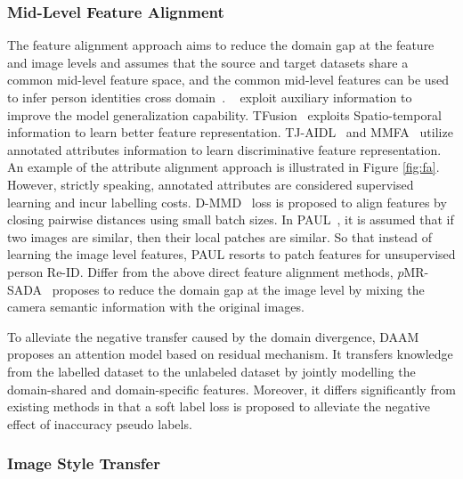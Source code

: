 \documentclass[a4paper,fleqn]{cas-dc}
\begin{document}
\subsubsection{Mid-Level Feature Alignment}
The feature alignment approach aims to reduce the domain gap at the feature and image levels and assumes that the source and target datasets share a common mid-level feature space, and the common mid-level features can be used to infer person identities cross domain~\cite{lin_multi-task_2018,wang_transferable_2018}. ~\cite{wang_transferable_2018,zhong_generalizing_2018,lv_unsupervised_2018} exploit auxiliary information to improve the model generalization capability. TFusion~\cite{lv_unsupervised_2018} exploits Spatio-temporal information to learn better feature representation. TJ-AIDL~\cite{wang_transferable_2018} and MMFA~\cite{lin_multi-task_2018} utilize annotated attributes information to learn discriminative feature representation. An example of the attribute alignment approach is illustrated in Figure \ref{fig:fa}. However, strictly speaking, annotated attributes are considered supervised learning and incur labelling costs. D-MMD~\cite{vedaldi_unsupervised_2020-1} loss is proposed to align features by closing pairwise distances using small batch sizes. In PAUL~\cite{yang_patch-based_2019}, it is assumed that if two images are similar, then their local patches are similar. So that instead of learning the image level features, PAUL resorts to patch features for unsupervised person Re-ID. Differ from the above direct feature alignment methods, $p$MR-SADA~\cite{wang_smoothing_2020} proposes to reduce the domain gap at the image level by mixing the camera semantic information with the original images.

To alleviate the negative transfer caused by the domain divergence,  DAAM~\cite{huang_domain_2020} proposes an attention model based on residual mechanism. It transfers knowledge from the labelled dataset to the unlabeled dataset by jointly modelling the domain-shared and domain-specific features. Moreover, it differs significantly from existing methods in that a soft label loss is proposed to alleviate the negative effect of inaccuracy pseudo labels.

\subsubsection{Image Style Transfer}
\end{document}
